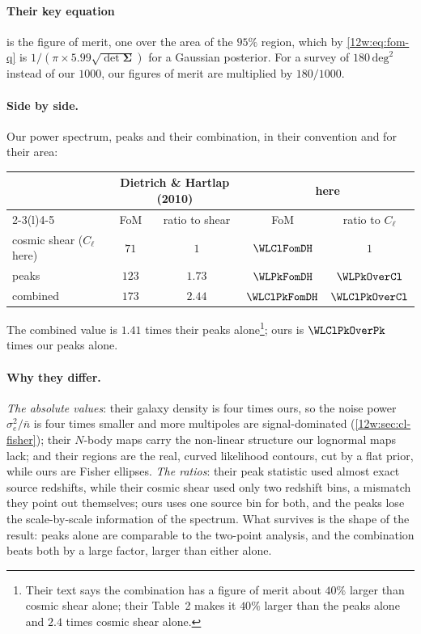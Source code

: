 \paragraph{Their key equation} is the figure of merit, one over the area of the $95\%$ region, which by
\eqref{12w:eq:fom-q} is $1/(\pi\times5.99\sqrt{\det\bm\Sigma})$ for a Gaussian posterior. For a survey of
$180\,\mathrm{deg}^2$ instead of our $1000$, our figures of merit are multiplied by $180/1000$.

\paragraph{Side by side.} Our power spectrum, peaks and their combination, in their convention and for their area:
\begin{center}
\small
\begin{tabular}{@{}lcccc@{}}
\toprule
 & \multicolumn{2}{c}{Dietrich \& Hartlap (2010)} & \multicolumn{2}{c}{here}\\
\cmidrule(lr){2-3}\cmidrule(l){4-5}
 & FoM & ratio to shear & FoM & ratio to $C_\ell$\\\midrule
cosmic shear ($C_\ell$ here) & $71$ & $1$ & $\WLClFomDH$ & $1$\\
peaks & $123$ & $1.73$ & $\WLPkFomDH$ & $\WLPkOverCl$\\
combined & $173$ & $2.44$ & $\WLClPkFomDH$ & $\WLClPkOverCl$\\
\bottomrule
\end{tabular}
\end{center}
The combined value is $1.41$ times their peaks alone\footnote{Their text says the combination has a figure of merit
about $40\%$ larger than cosmic shear alone; their Table~2 makes it $40\%$ larger than the peaks alone and $2.4$ times
cosmic shear alone.}; ours is $\WLClPkOverPk$ times our peaks alone.

\paragraph{Why they differ.} \emph{The absolute values}: their galaxy density is four times ours, so the noise power
$\sigma_e^2/\bar n$ is four times smaller and more multipoles are signal-dominated (\cref{12w:sec:cl-fisher}); their
$N$-body maps carry the non-linear structure our lognormal maps lack; and their regions are the real, curved
likelihood contours, cut by a flat prior, while ours are Fisher ellipses. \emph{The ratios}: their peak statistic
used almost exact source redshifts, while their cosmic shear used only two redshift bins, a mismatch they point out
themselves; ours uses one source bin for both, and the peaks lose the scale-by-scale information of the spectrum.
What survives is the shape of the result: peaks alone are comparable to the two-point analysis, and the combination
beats both by a large factor, larger than either alone.

